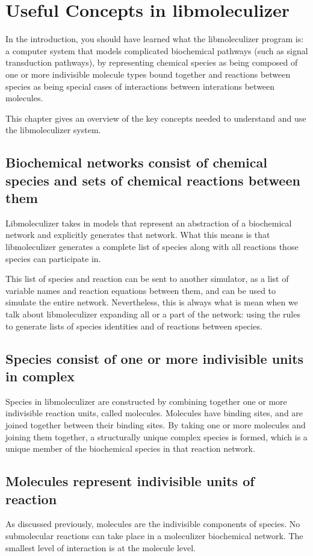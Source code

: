 \chapter{Useful Concepts in libmoleculizer}
\label{chap:conceptualOverviewChapter}

In the introduction, you should have learned what the libmoleculizer
program is: a computer system that models complicated biochemical
pathways (such as signal transduction pathways), by representing chemical
species as being composed of one or more indivisible molecule types
bound together and reactions between species as being special cases of
interactions between interations between molecules.  

This chapter gives an overview of the key concepts needed to
understand and use the libmoleculizer system.  

\section{Biochemical networks consist of chemical species and sets of
  chemical  reactions between them}
Libmoleculizer takes in models that represent an abstraction of a
biochemical network and explicitly generates that network.  What this
means is that libmoleculizer generates a complete list of species
along with all reactions those species can participate in.  

This list of species and reaction can be sent to another simulator, as
a list of variable names and reaction equations between them, and can
be used to simulate the entire network.  Nevertheless, this is always
what is mean when we talk about libmoleculizer expanding all or a part
of the network: using the rules to generate lists of species
identities and of reactions between species.

\section{Species consist of one or more indivisible units in complex}

Species in libmoleculizer are constructed by combining together one or
more indivisible reaction units, called molecules.  Molecules have
binding sites, and are joined together between their binding sites.
By taking one or more molecules and joining them together, a
structurally unique complex species is formed, which is a unique
member of the biochemical species in that reaction network.

\section{Molecules represent indivisible units of reaction}
As discussed previously, molecules are the indivisible components of
species.  No submolecular reactions can take place in a moleculizer
biochemical network.  The smallest level of interaction is at the
molecule level.  

